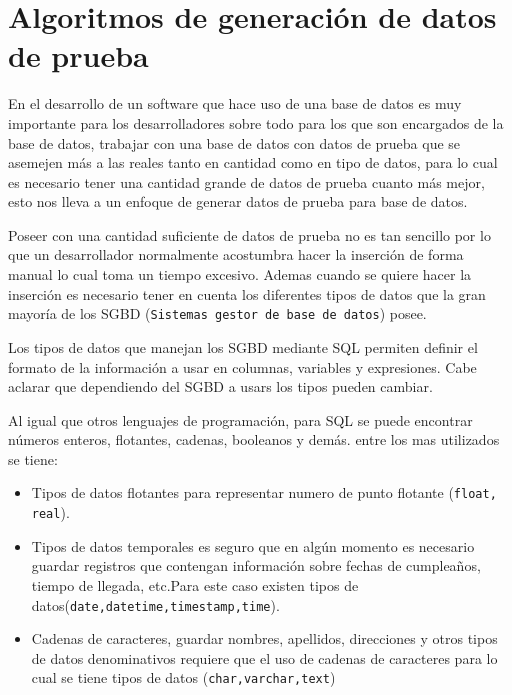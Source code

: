 \chapter{Algoritmos de generaci\'on de datos de prueba}
En el desarrollo de un software que hace uso de una base de datos es muy importante para los desarrolladores sobre todo para los que son encargados de la base de datos, trabajar con una base de datos con datos de prueba  que se asemejen m\'as a las reales tanto en cantidad como en tipo de datos, para lo cual es necesario tener una cantidad grande de datos de prueba cuanto m\'as mejor, esto nos lleva a un enfoque de generar datos de prueba para base de datos.


Poseer con una cantidad suficiente de datos de prueba no es tan sencillo por lo que un desarrollador normalmente acostumbra hacer la inserci\'on de forma manual lo cual toma un  tiempo excesivo. Ademas cuando se quiere hacer la inserci\'on es necesario tener en cuenta los diferentes tipos de datos que la gran mayor\'ia de los SGBD (\texttt{Sistemas gestor de base de datos}) posee.
 
Los tipos de datos que manejan los SGBD mediante SQL permiten definir el formato de la informaci\'on a usar en  columnas, variables y expresiones. Cabe aclarar que dependiendo del SGBD a usars los tipos pueden cambiar.

Al igual que otros lenguajes de programaci\'on, para SQL se puede encontrar n\'umeros enteros, flotantes, cadenas, booleanos y dem\'as. entre los mas utilizados se tiene:

\begin{itemize}
\item Tipos de datos flotantes para representar numero de punto flotante (\texttt{float, real}).
\item Tipos de datos temporales es seguro que en alg\'un momento es necesario guardar registros que contengan informaci\'on sobre fechas de cumplea\~nos, tiempo de llegada, etc.Para este caso existen tipos de datos(\texttt{date,datetime,timestamp,time}).
\item Cadenas de caracteres, guardar nombres, apellidos, direcciones y otros tipos de datos denominativos requiere que el uso de cadenas de caracteres para lo cual se tiene tipos de datos (\texttt{char,varchar,text})
\end{itemize}

